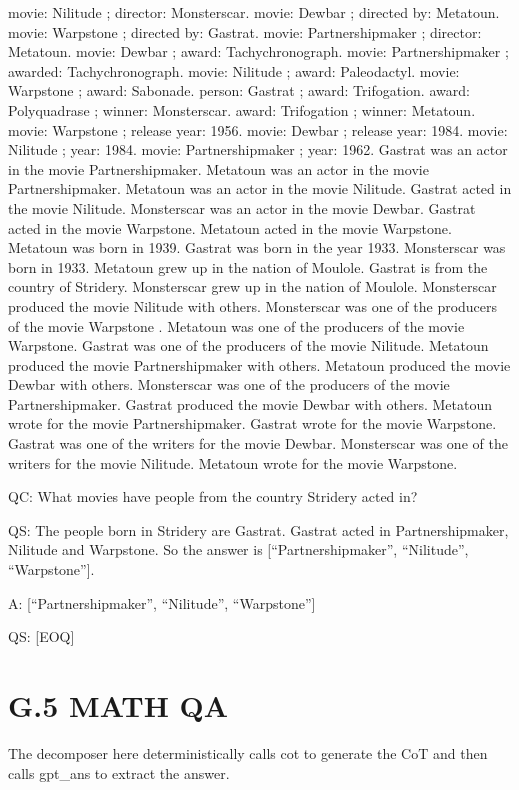 \documentclass[
]{article}
\begin{document}
movie: Nilitude ; director: Monsterscar. movie: Dewbar ; directed by:
Metatoun. movie: Warpstone ; directed by: Gastrat. movie:
Partnershipmaker ; director: Metatoun. movie: Dewbar ; award:
Tachychronograph. movie: Partnershipmaker ; awarded: Tachychronograph.
movie: Nilitude ; award: Paleodactyl. movie: Warpstone ; award:
Sabonade. person: Gastrat ; award: Trifogation. award: Polyquadrase ;
winner: Monsterscar. award: Trifogation ; winner: Metatoun. movie:
Warpstone ; release year: 1956. movie: Dewbar ; release year: 1984.
movie: Nilitude ; year: 1984. movie: Partnershipmaker ; year: 1962.
Gastrat was an actor in the movie Partnershipmaker. Metatoun was an
actor in the movie Partnershipmaker. Metatoun was an actor in the movie
Nilitude. Gastrat acted in the movie Nilitude. Monsterscar was an actor
in the movie Dewbar. Gastrat acted in the movie Warpstone. Metatoun
acted in the movie Warpstone. Metatoun was born in 1939. Gastrat was
born in the year 1933. Monsterscar was born in 1933. Metatoun grew up in
the nation of Moulole. Gastrat is from the country of Stridery.
Monsterscar grew up in the nation of Moulole. Monsterscar produced the
movie Nilitude with others. Monsterscar was one of the producers of the
movie Warpstone . Metatoun was one of the producers of the movie
Warpstone. Gastrat was one of the producers of the movie Nilitude.
Metatoun produced the movie Partnershipmaker with others. Metatoun
produced the movie Dewbar with others. Monsterscar was one of the
producers of the movie Partnershipmaker. Gastrat produced the movie
Dewbar with others. Metatoun wrote for the movie Partnershipmaker.
Gastrat wrote for the movie Warpstone. Gastrat was one of the writers
for the movie Dewbar. Monsterscar was one of the writers for the movie
Nilitude. Metatoun wrote for the movie Warpstone.

QC: What movies have people from the country Stridery acted in?

QS: The people born in Stridery are Gastrat. Gastrat acted in
Partnershipmaker, Nilitude and Warpstone. So the answer is
{[}``Partnershipmaker'', ``Nilitude'', ``Warpstone''{]}.

A: {[}``Partnershipmaker'', ``Nilitude'', ``Warpstone''{]}

QS: {[}EOQ{]}

\section{G.5 MATH QA}\label{g.5-math-qa}

The decomposer here deterministically calls cot to generate the CoT and
then calls gpt\_ans to extract the answer.
\end{document}
